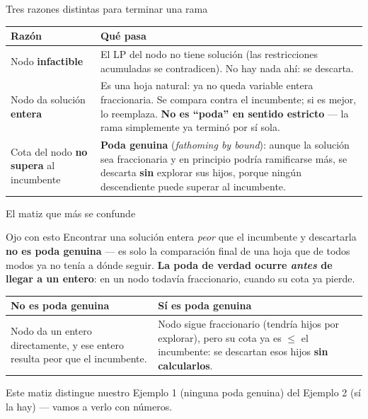 \documentclass[aspectratio=169]{beamer}
\begin{document}
\begin{frame}{Tres razones distintas para terminar una rama}
\begin{center}
\renewcommand{\arraystretch}{1.5}
\begin{tabular}{@{}p{3.6cm}p{8.7cm}@{}}
\toprule
\textbf{Razón} & \textbf{Qué pasa}\\
\midrule
Nodo \textbf{infactible} & El LP del nodo no tiene solución (las restricciones acumuladas se contradicen). No hay nada ahí: se descarta.\\
Nodo da solución \textbf{entera} & Es una hoja natural: ya no queda variable entera fraccionaria. Se compara contra el incumbente; si es mejor, lo reemplaza. \textbf{No es ``poda'' en sentido estricto} --- la rama simplemente ya terminó por sí sola.\\
Cota del nodo \textbf{no supera} al incumbente & \textbf{Poda genuina} (\emph{fathoming by bound}): aunque la solución sea fraccionaria y en principio podría ramificarse más, se descarta \textbf{sin} explorar sus hijos, porque ningún descendiente puede superar al incumbente.\\
\bottomrule
\end{tabular}
\end{center}
\end{frame}

\begin{frame}{El matiz que más se confunde}
\begin{alertblock}{Ojo con esto}
\small Encontrar una solución entera \emph{peor} que el incumbente y descartarla \textbf{no es poda genuina} --- es solo la comparación final de una hoja que de todos modos ya no tenía a dónde seguir. \textbf{La poda de verdad ocurre \emph{antes} de llegar a un entero}: en un nodo todavía fraccionario, cuando su cota ya pierde.
\normalsize
\end{alertblock}

\vspace{-0.1cm}
\begin{center}
\small
\renewcommand{\arraystretch}{1.2}
\begin{tabular}{@{}p{5.4cm}p{5.4cm}@{}}
\toprule
\textbf{No es poda genuina} & \textbf{Sí es poda genuina}\\
\midrule
Nodo da un entero directamente, y ese entero resulta peor que el incumbente. & Nodo sigue fraccionario (tendría hijos por explorar), pero su cota ya es $\leq$ el incumbente: se descartan esos hijos \textbf{sin calcularlos}.\\
\bottomrule
\end{tabular}
\end{center}

\small Este matiz distingue nuestro Ejemplo 1 (ninguna poda genuina) del Ejemplo 2 (sí la hay) --- vamos a verlo con números.
\end{frame}
\end{document}
